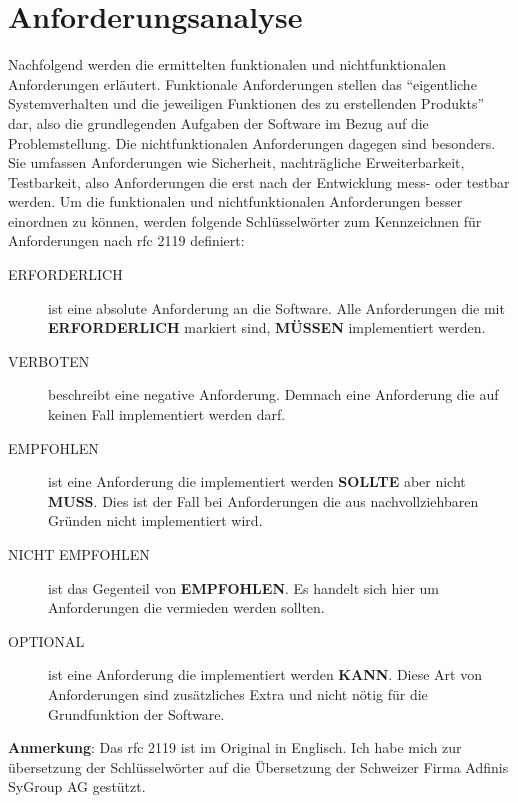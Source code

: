 \documentclass[titlepage]{report}
\begin{document}
\section*{Anforderungsanalyse}
Nachfolgend werden die ermittelten funktionalen und nichtfunktionalen
Anforderungen erläutert. Funktionale Anforderungen stellen das
``eigentliche Systemverhalten und die jeweiligen Funktionen des zu
erstellenden Produkts''\cite[S. 20]{BPSE} dar, also die grundlegenden
Aufgaben der Software im Bezug auf die Problemstellung. Die
nichtfunktionalen Anforderungen dagegen sind besonders. Sie umfassen
Anforderungen wie Sicherheit, nachträgliche Erweiterbarkeit,
Testbarkeit, also Anforderungen die erst nach der Entwicklung
mess\hyp{} oder testbar werden\cite[S. 292]{SNFA}. Um die funktionalen
und nichtfunktionalen Anforderungen besser einordnen zu können, werden
folgende Schlüsselwörter zum Kennzeichnen für Anforderungen nach
\gls{rfc} 2119\cite{RFC2119} definiert:
\begin{description}
    \item[ERFORDERLICH] ist eine absolute Anforderung an die Software. Alle
        Anforderungen die mit \textbf{ERFORDERLICH} markiert sind,
        \textbf{MÜSSEN} implementiert werden.
    \item[VERBOTEN] beschreibt eine negative Anforderung. Demnach eine
        Anforderung die auf keinen Fall implementiert werden darf.
    \item[EMPFOHLEN] ist eine Anforderung die implementiert werden
        \textbf{SOLLTE} aber nicht \textbf{MUSS}. Dies ist der Fall bei
        Anforderungen die aus nachvollziehbaren Gründen nicht
        implementiert wird.
    \item[NICHT EMPFOHLEN] ist das Gegenteil von \textbf{EMPFOHLEN}. Es
        handelt sich hier um Anforderungen die vermieden werden sollten.
    \item[OPTIONAL] ist eine Anforderung die implementiert werden
        \textbf{KANN}. Diese Art von Anforderungen sind
        zusätzliches Extra und nicht nötig für die Grundfunktion der
        Software.
\end{description}
\textbf{Anmerkung}: Das \gls{rfc} 2119 ist im Original in Englisch. Ich
habe mich zur übersetzung der Schlüsselwörter auf die Übersetzung der
Schweizer Firma Adfinis SyGroup AG gestützt\cite{RFC2119DE}.
\end{document}
